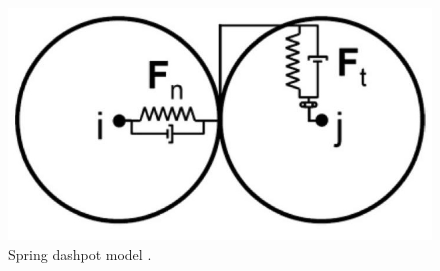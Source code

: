 \begin{figure}[!htb]
\centering
\includegraphics[width=.40\columnwidth]{images/128springdashpot}
\caption[Spring dashpot]{Spring dashpot model \cite{RefWorks:201}.}
\label{fig:128springdashpot}
\end{figure}
